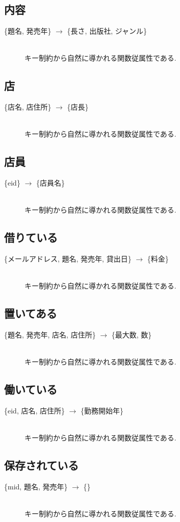 \documentclass{jarticle}
\begin{document}
\subsection{内容}
\begin{description}
\item[\{題名, 発売年\} $\rightarrow$ \{長さ, 出版社, ジャンル\}] \leavevmode \\
キー制約から自然に導かれる関数従属性である.
\end{description}
\subsection{店}
\begin{description}
\item[\{店名, 店住所\} $\rightarrow$ \{店長\}] \leavevmode \\
キー制約から自然に導かれる関数従属性である.
\end{description}
\subsection{店員}
\begin{description}
\item[\{eid\} $\rightarrow$ \{店員名\}] \leavevmode \\
キー制約から自然に導かれる関数従属性である.
\end{description}
\subsection{借りている}
\begin{description}
\item[\{メールアドレス, 題名, 発売年, 貸出日\} $\rightarrow$ \{料金\}] \leavevmode \\
キー制約から自然に導かれる関数従属性である.
\end{description}
\subsection{置いてある}
\begin{description}
\item[\{題名, 発売年, 店名, 店住所\} $\rightarrow$ \{最大数, 数\}] \leavevmode \\
キー制約から自然に導かれる関数従属性である.
\end{description}
\subsection{働いている}
\begin{description}
\item[\{eid, 店名, 店住所\} $\rightarrow$ \{勤務開始年\}] \leavevmode \\
キー制約から自然に導かれる関数従属性である.
\end{description}
\subsection{保存されている}
\begin{description}
\item[\{mid, 題名, 発売年\} $\rightarrow$ \{\}] \leavevmode \\
キー制約から自然に導かれる関数従属性である.
\end{description}
\end{document}
